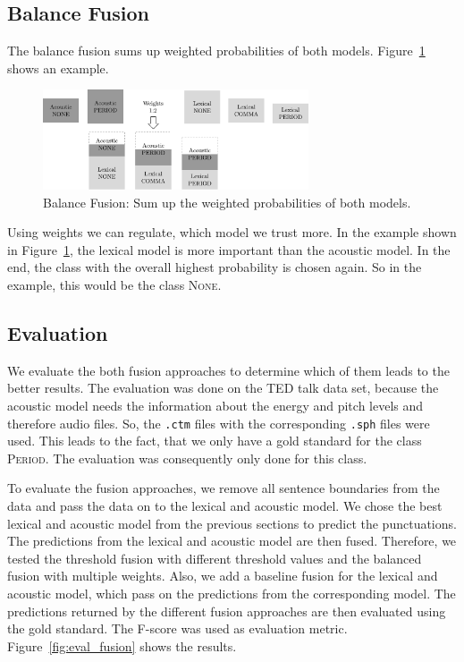 \subsection{Balance Fusion}
The balance fusion sums up weighted probabilities of both models.
Figure~\ref{fig:fusion_2} shows an example.
\begin{figure}[ht]
    \centering
    \includegraphics[width=0.7\textwidth]{img/fusion_2.pdf}
    \caption{Balance Fusion: Sum up the weighted probabilities of both models.}
    \label{fig:fusion_2}
\end{figure}
Using weights we can regulate, which model we trust more.
In the example shown in Figure~\ref{fig:fusion_2}, the lexical model is more important than the acoustic model. 
In the end, the class with the overall highest probability is chosen again.
So in the example, this would be the class \textsc{None}.

\subsection{Evaluation}
We evaluate the both fusion approaches to determine which of them leads to the better results.
The evaluation was done on the TED talk data set, because the acoustic model needs the information about the energy and pitch levels and therefore audio files.
So, the \texttt{.ctm} files with the corresponding \texttt{.sph} files were used.
This leads to the fact, that we only have a gold standard for the class \textsc{Period}.
The evaluation was consequently only done for this class.

To evaluate the fusion approaches, we remove all sentence boundaries from the data and pass the data on to the lexical and acoustic model.
We chose the best lexical and acoustic model from the previous sections to predict the punctuations.
The predictions from the lexical and acoustic model are then fused.
Therefore, we tested the threshold fusion with different threshold values and the balanced fusion with multiple weights.
Also, we add a baseline fusion for the lexical and acoustic model, which pass on the predictions from the corresponding model.
The predictions returned by the different fusion approaches are then evaluated using the gold standard.
The F-score was used as evaluation metric.
Figure~\ref{fig:eval_fusion} shows the results.

